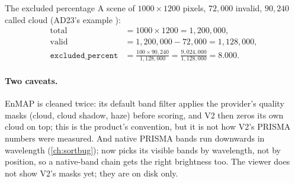 \begin{worked}[label={we:material:excluded}]{The excluded percentage}
A scene of $1000\times1200$ pixels, $72{,}000$ invalid, $90{,}240$ called cloud (AD23's example \tagA):
\begin{align*}
\text{total} &= 1000\times1200 = 1{,}200{,}000,\\
\text{valid} &= 1{,}200{,}000-72{,}000 = 1{,}128{,}000,\\
\texttt{excluded\_percent} &= \frac{100\times90{,}240}{1{,}128{,}000} = \frac{9{,}024{,}000}{1{,}128{,}000} = 8.000.
\end{align*}
\end{worked}

\paragraph{Two caveats.} EnMAP is cleaned twice: its default band filter applies the provider's quality masks
(cloud, cloud shadow, haze) before scoring, and V2 then zeros its own cloud on top; this is the product's
convention, but it is not how V2's PRISMA numbers were measured. And native PRISMA bands run downwards in
wavelength (\cref{ch:sortbug});  now picks its visible bands by wavelength, not by
position, so a native-band chain gets the right brightness too. The viewer does not show V2's masks yet; they
are on disk only.


